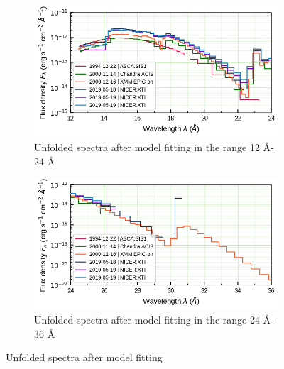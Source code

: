     \begin{figure}[!bht]
        \centering
        \begin{subfigure}[b]{0.45\textwidth}
            \includegraphics[width=\textwidth]{figures/eufspec/mr-vel-uf_all-obs_12-24.png}
            \caption{Unfolded spectra after model fitting in the range 12 \AA - 24 \AA}
            \label{fig:all-uf:12-24}
        \end{subfigure}
        \hfill
        \begin{subfigure}[b]{0.45\textwidth}
            \includegraphics[width=\textwidth]{figures/eufspec/mr-vel-uf_all-obs_24-36.png}
            \caption{Unfolded spectra after model fitting in the range 24 \AA - 36 \AA}
            \label{fig:all-uf:24-36}
        \end{subfigure}
        \caption{Unfolded spectra after model fitting}
        \label{fig:all-uf}
    \end{figure}

